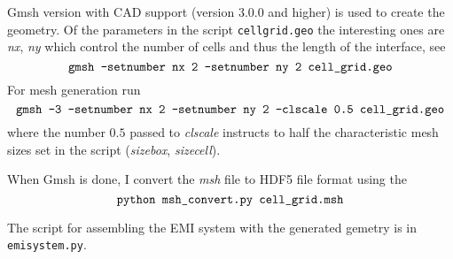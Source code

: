 \documentclass[11pt,a4paper]{article}
\begin{document}
Gmsh version with CAD support (version 3.0.0 and higher) is used to create
the geometry. Of the parameters in the script \texttt{cell\textunderscore grid.geo}
the interesting ones are \emph{nx}, \emph{ny} which control the number of cells
and thus the length of the interface, see
\[
\texttt{gmsh -setnumber nx 2 -setnumber ny 2 cell\textunderscore grid.geo}
\]
For mesh generation run
\[
\texttt{gmsh -3 -setnumber nx 2 -setnumber ny 2 -clscale 0.5 cell\textunderscore grid.geo}
\]
where the number $0.5$ passed to \emph{clscale} instructs to half the characteristic
mesh sizes set in the script (\emph{size}\textunderscore\emph{box},
\emph{size}\textunderscore\emph{cell}).

When Gmsh is done, I convert the \emph{msh} file to HDF5 file format
using the
\[
\texttt{python msh\textunderscore convert.py cell\textunderscore grid.msh}
\]

The script for assembling the EMI system with the generated gemetry is
in \texttt{emi\textunderscore system.py}.
\end{document}
